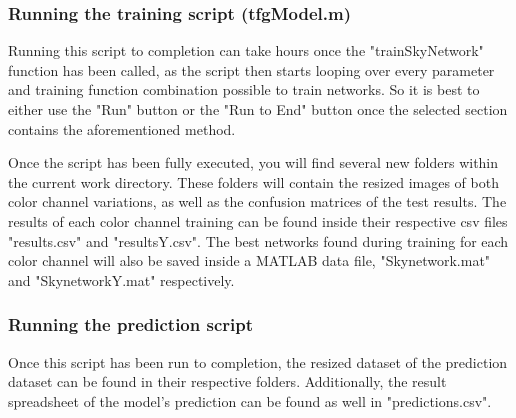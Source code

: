 \subsubsection{Running the training script (tfgModel.m)}
Running this script to completion can take hours once the "trainSkyNetwork" function has been called, as the script then starts looping over every parameter and training function combination possible to train networks. So it is best to either use the "Run" button or the "Run to End" button once the selected section contains the aforementioned method.

Once the script has been fully executed, you will find several new folders within the current work directory. These folders will contain the resized images of both color channel variations, as well as the confusion matrices of the test results. The results of each color channel training can be found inside their respective csv files "results.csv" and "resultsY.csv". The best networks found during training for each color channel will also be saved inside a MATLAB data file, "Skynetwork.mat" and  "SkynetworkY.mat" respectively.

\subsubsection{Running the prediction script}
Once this script has been run to completion, the resized dataset of the prediction dataset can be found in their respective folders. Additionally, the result spreadsheet of the model's prediction can be found as well in "predictions.csv".
